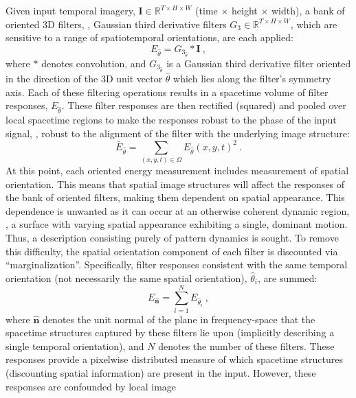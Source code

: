 Given input temporal imagery, $\mathbf{I} \in \mathbb{R}^{T \times H \times W}$ (time $\times$ height $\times$ width), a bank of oriented 3D
filters, \eg, Gaussian third derivative filters $G_3 \in \mathbb{R}^{T \times H \times W}$, which are sensitive to a range of
spatiotemporal orientations, are each applied:
\begin{equation}
	E_{\hat{\theta}} = G_{3_{\hat{\theta}}} \ast \mathbf{I}\ ,
\end{equation}
where $\ast$ denotes convolution, and $G_{3_{\hat{\theta}}}$ is a Gaussian third derivative filter oriented in the direction of the 3D unit vector $\hat{\theta}$ which lies along the filter's symmetry axis. Each of these filtering operations results in a spacetime volume of filter responses, $E_{\hat{\theta}}$.
These filter responses are then rectified (squared) and
pooled over local spacetime regions to make the responses robust
to the phase of the input signal, \ie, robust to the
alignment of the filter with the underlying image
structure:
\begin{equation}
	\bar{E}_{\hat{\theta}} = \sum_{(x, y, t) \in \Omega}{{E_{\hat{\theta}}(x, y, t)}^2}\ .
\end{equation}
At this point, each oriented energy measurement includes measurement of spatial orientation. This means that spatial image structures will affect the responses of the bank of oriented filters, making them dependent on spatial appearance. This dependence is unwanted as it can occur at an otherwise coherent dynamic region, \eg, a surface with varying spatial appearance exhibiting a single, dominant motion. Thus, a description consisting purely of pattern dynamics is sought.
To remove this difficulty, the spatial orientation component of each filter is discounted via ``marginalization''. Specifically, filter responses consistent with the same temporal orientation (not necessarily the same spatial orientation), $\hat{\theta}_i$, are summed:
\begin{equation}
	E_{\hat{\mathbf{n}}} = \sum_{i = 1}^{N}{E_{\hat{\theta}_i}}\ ,
	\label{eq:oriented_filter_2.8}
\end{equation}
where $\hat{\mathbf{n}}$ denotes the unit normal of the plane in frequency-space that the spacetime structures captured by these filters lie upon (implicitly describing a single temporal orientation), and $N$ denotes the number of these filters.
These responses provide a pixelwise distributed measure
of which spacetime structures (discounting spatial information) are
present in the input.
However, these responses are confounded by local image
